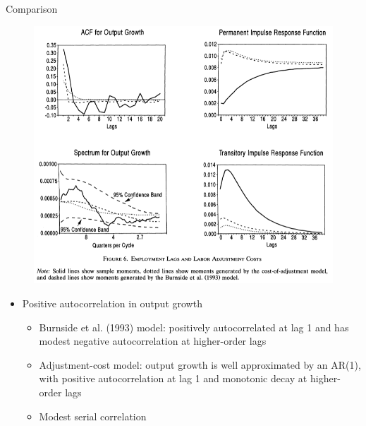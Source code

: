 \documentclass[10pt]{beamer}
\begin{document}
\begin{frame}{Comparison}
\begin{figure}
    \centering
  \includegraphics[width=0.6\linewidth]{labor cost.png}
\end{figure}
\begin{itemize}
    \item Positive autocorrelation in output growth
    \begin{itemize}
        \item Burnside et al. (1993) model: positively autocorrelated at lag 1 and has modest negative autocorrelation at higher-order lags
        \item Adjustment-cost model: output growth is well approximated by an AR(1), with positive autocorrelation at lag 1 and monotonic decay at higher-order lags
    \item Modest serial correlation
    \end{itemize}
\end{itemize}
    
\end{frame}
\end{document}
